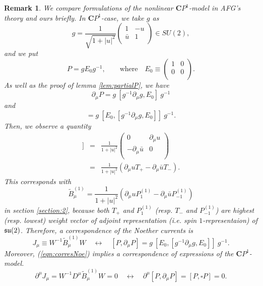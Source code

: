 \documentclass[makeidx,12pt,openany]{report}
\newtheorem{rmk}[df]{Remark}
\begin{document}
\begin{rmk}
We compare formulations of the nonlinear ${\mathbf{C}}P^1$-model 
in AFG's theory and ours briefly. 
In ${\mathbf{C}}P^1$-case, we take $g$ as 
\begin{equation}
g=\frac{1}{\sqrt{1+|u|^2}}
           \left(
            \begin{array}{cc}
               1      & -u \\
              \bar{u} &  1 \\
            \end{array}
           \right) \in SU(2),
\label{eqn:g}
\end{equation}
and we put
$$P=g E_0 g^{-1}, 
\qquad \mbox{where} \quad 
E_0 \equiv \left(
       \begin{array}{cc}
           1 & 0 \\
           0 & 0 \\
       \end{array}
    \right) . $$
As well as the proof of lemma \ref{lem:partialP}, we have
\begin{equation}
\partial_{\mu}P=g \ [g^{-1}\partial_{\mu}g,E_0] \ g^{-1} 
\label{eqn:parP}
\end{equation}
and
\begin{equation}
[P,\partial_{\mu}P]
=g \ [E_0, [g^{-1}\partial_{\mu}g,E_0]] \ g^{-1}. 
    \label{eqn:Btil}
\end{equation}
Then, we observe a quantity 
\begin{eqnarray}
[E_0, [g^{-1}\partial_{\mu}g,E_0]]
&=&\frac{1}{1+|u|^2}
           \left(
            \begin{array}{cc}
               0    & \partial_{\mu}u \\
            -\partial_{\mu}\bar{u} & 0 \\
            \end{array}
           \right) \nonumber\\
&=&\frac{1}{1+|u|^2}(\partial_{\mu}u T_+ -\partial_{\mu}\bar{u} T_-). 
\end{eqnarray}
This corresponds with 
\begin{equation}
\tilde{B}_{\mu}^{(1)}=\frac{1}{1+|u|^2}
             (\partial_{\mu}u P_1^{(1)}-\partial_{\mu}\bar{u} P_{-1}^{(1)})
\label{eqn:Btilde}
\end{equation}
in section \ref{section:2}, 
because both $T_+$ and $P_1^{(1)}$ (resp. $T_-$ and $P_{-1}^{(1)}$) are 
highest (resp. lowest) weight vector of adjoint representation 
(i.e. spin $1$-representaion) of 
${\frak s}{\frak u}(2)$. 
Therefore, a correspondence of the Noether currents is 
\begin{equation}
  J_{\mu} \equiv W^{-1}\tilde{B}_{\mu}^{(1)}W
\quad \leftrightarrow \quad 
[P,\partial_{\mu}P]
=g \ [E_0, [g^{-1}\partial_{\mu}g,E_0]] \ g^{-1}. 
 \label{eqn:corresNoe}
\end{equation}
Moreover, (\ref{eqn:corresNoe}) implies a correspondence of expressions of 
the $\mathbf{C}P^1$-model. 
\begin{equation}
 \partial^{\mu}J_{\mu}=W^{-1}D^{\mu}\tilde{B}_{\mu}^{(1)}W=0 
\quad \leftrightarrow \quad 
 \partial^{\mu}[P,\partial_{\mu}P]=[P,\square P]=0. 
\end{equation}
\end{rmk}
\end{document}
